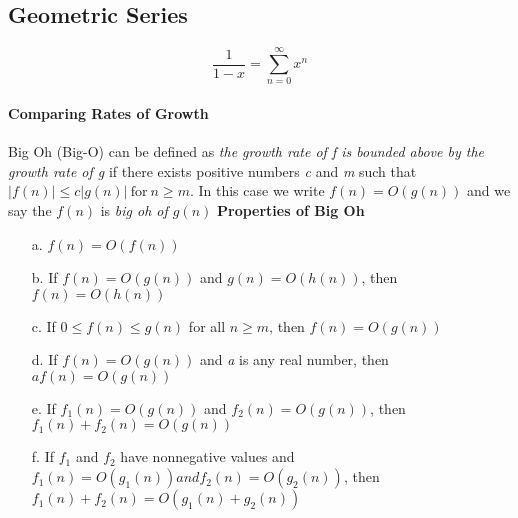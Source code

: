 \documentclass[10pt,twocolumn]{article}
\begin{document}
	\subsection{Geometric Series}
		\[\frac{1}{1-x}=\sum_{n=0}^\infty x^n\]
	
        \paragraph*{Comparing Rates of Growth}
        Big Oh (Big-O) can be defined as \textit{the growth rate of f is
          bounded above by the growth rate of g} if there exists positive
        numbers \textit{c} and \textit{m} such that $|f(n)| \leq
        c|g(n)| \: \textrm{for}\: n\geq m$. In this case we write $f(n)
        = O(g(n))$ and we say the $f(n)$ is \textit{big oh of $g(n)$}
        \textbf{Properties of Big Oh}
       \begin{itemize}
        \item[a.] $f(n)=O(f(n))$
        \item[b.] If $f(n)=O(g(n))$ and $ g(n)=O(h(n))$, then $f(n)=O(h(n))$
        \item[c.] If $0\leq f(n) \leq g(n)$ for all $n \geq m$, then $f(n)=O(g(n))$
        \item[d.] If $f(n)=O(g(n))$ and \textit{a} is any real number, then $af(n)=O(g(n))$
        \item[e.] If $f_1(n)=O(g(n))$ and $f_2(n)=O(g(n))$, then $f_1(n) + f_2(n) = O(g(n))$
        \item[f.] If $f_1$ and $f_2$ have nonnegative values and
          $f_1(n) = O(g_1(n)) and f_2(n) = O(g_2(n))$, then $f_1(n) +
          f_2(n) = O(g_1(n) + g_2(n))$
	\end{itemize}
\end{document}
